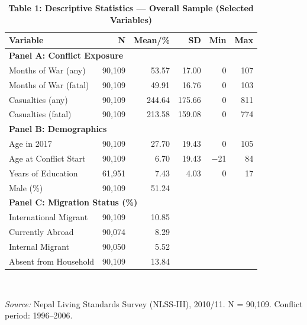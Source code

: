 \documentclass[12pt,letterpaper]{article}
\begin{document}
\begin{table}[H]
\centering
\caption*{\textbf{Table 1: Descriptive Statistics --- Overall Sample (Selected Variables)}}
\footnotesize
\begin{tabular}{@{}l r r r r r@{}}
\toprule
Variable & N & Mean/\% & SD & Min & Max \\
\midrule
\multicolumn{6}{l}{\textbf{Panel A: Conflict Exposure}} \\
\quad Months of War (any)          & 90,109 & 53.57  & 17.00  & 0   & 107 \\
\quad Months of War (fatal)        & 90,109 & 49.91  & 16.76  & 0   & 103 \\
\quad Casualties (any)             & 90,109 & 244.64 & 175.66 & 0   & 811 \\
\quad Casualties (fatal)           & 90,109 & 213.58 & 159.08 & 0   & 774 \\[3pt]
\multicolumn{6}{l}{\textbf{Panel B: Demographics}} \\
\quad Age in 2017                  & 90,109 & 27.70  & 19.43  & 0   & 105 \\
\quad Age at Conflict Start        & 90,109 & 6.70   & 19.43  & $-$21 & 84 \\
\quad Years of Education           & 61,951 & 7.43   & 4.03   & 0   & 17 \\
\quad Male (\%)                    & 90,109 & 51.24  &        &     &     \\[3pt]
\multicolumn{6}{l}{\textbf{Panel C: Migration Status (\%)}} \\
\quad International Migrant        & 90,109 & 10.85  &  &  &  \\
\quad Currently Abroad             & 90,074 & 8.29   &  &  &  \\
\quad Internal Migrant             & 90,050 & 5.52   &  &  &  \\
\quad Absent from Household        & 90,109 & 13.84  &  &  &  \\
\bottomrule
\end{tabular}
\\[4pt]
\begin{minipage}{0.9\textwidth}
\scriptsize
\textit{Source:} Nepal Living Standards Survey (NLSS-III), 2010/11. N = 90,109. Conflict period: 1996--2006.
\end{minipage}
\end{table}
\end{document}
